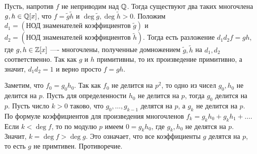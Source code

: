 \begin{solution}
Пусть, напротив \(f\) не неприводим над \(\mathbb{Q}\). Тогда существуют два таких многочлена \(g,h\in\mathbb{Q}[x]\), что
\(f=\tilde{g}\tilde{h}\) и \(\deg{\tilde{g}}, \deg{\tilde{h}} > 0\).
Положим \(d_1 = (\text{НОД знаменателей коэффициентов }\tilde{g})\) и \(d_2 = (\text{НОД знаменателей коэффициентов }\tilde{h})\). Тогда есть разложение \(d_1 d_2 f = g h\), где \(g, h \in \mathbb{Z}[x]\) ---- многочлены, полученные домножением \(\tilde{g},\tilde{h}\) на \(d_1,d_2\) соответственно. Так как \(g\) и \(h\) примитивны, то их произведение примитивно, а значит, \(d_1 d_2 = 1\) и верно просто \(f = gh\).

Заметим, что \(f_0 = g_0 h_0\). Так как \(f_0\) не делится на \(p^2\), то одно из чисел \(g_0, h_0\) не делится на \(p\). Пусть для определенности \(h_0\) не делится на \(p\), тогда \(g_0\) делится на \(p\). Пусть число \(k > 0\) таково, что \(g_0, \ldots, g_{k-1}\) делятся на \(p\), а \(g_k\) не делится на \(p\). По формуле коэффициентов для произведения многочленов \(f_k = g_k h_0 + g_k h_1 + \ldots\). Если \(k < \deg f\), то по модулю \(p\) имеем \(0 = g_k h_0\), где \(g_k, h_0\) не делятся на \(p\). Значит, \(k = \deg f > \deg g\). Это означает, что все коэффициенты \(g\) делятся на \(p\), то есть \(g\) не примтивен.
Противоречие.


\end{solution}

